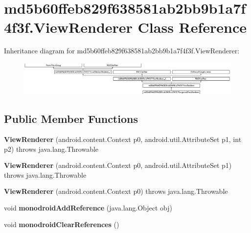 \hypertarget{classmd5b60ffeb829f638581ab2bb9b1a7f4f3f_1_1ViewRenderer}{}\section{md5b60ffeb829f638581ab2bb9b1a7f4f3f.\+View\+Renderer Class Reference}
\label{classmd5b60ffeb829f638581ab2bb9b1a7f4f3f_1_1ViewRenderer}
Inheritance diagram for md5b60ffeb829f638581ab2bb9b1a7f4f3f.\+View\+Renderer\+:\begin{figure}[H]
\begin{center}
\leavevmode
\includegraphics[height=1.754386cm]{classmd5b60ffeb829f638581ab2bb9b1a7f4f3f_1_1ViewRenderer}
\end{center}
\end{figure}
\subsection*{Public Member Functions}
\begin{DoxyCompactItemize}
\item 
\mbox{\label{classmd5b60ffeb829f638581ab2bb9b1a7f4f3f_1_1ViewRenderer_a7824854b6d56615c217020e835a18df7}} 
{\bfseries View\+Renderer} (android.\+content.\+Context p0, android.\+util.\+Attribute\+Set p1, int p2)  throws java.\+lang.\+Throwable 	
\item 
\mbox{\label{classmd5b60ffeb829f638581ab2bb9b1a7f4f3f_1_1ViewRenderer_adb13c4a3014dd0c910b8ccf98f0c66c8}} 
{\bfseries View\+Renderer} (android.\+content.\+Context p0, android.\+util.\+Attribute\+Set p1)  throws java.\+lang.\+Throwable 	
\item 
\mbox{\label{classmd5b60ffeb829f638581ab2bb9b1a7f4f3f_1_1ViewRenderer_a6c38e734de3e5855f03713824966678f}} 
{\bfseries View\+Renderer} (android.\+content.\+Context p0)  throws java.\+lang.\+Throwable 	
\item 
\mbox{\label{classmd5b60ffeb829f638581ab2bb9b1a7f4f3f_1_1ViewRenderer_a9ce576208d6e67c5201f21b67a8baf34}} 
void {\bfseries monodroid\+Add\+Reference} (java.\+lang.\+Object obj)
\item 
\mbox{\label{classmd5b60ffeb829f638581ab2bb9b1a7f4f3f_1_1ViewRenderer_aa03a52443eaab5b1890013945129a8e2}} 
void {\bfseries monodroid\+Clear\+References} ()
\end{DoxyCompactItemize}
